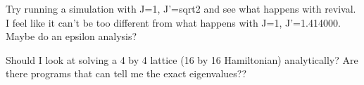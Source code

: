 \documentclass[a4paper,10pt]{article}
\theoremstyle{plain}
\begin{document}
Try running a simulation with J=1, J'=sqrt2 and see what happens with revival. 
I feel like it can't be too different from what happens with J=1, 
J'=1.414000. Maybe do an epsilon analysis?


Should I look at solving a 4 by 4 lattice (16 by 16 Hamiltonian) analytically?
Are there programs that can tell me the exact eigenvalues??

\newpage




\end{document}

